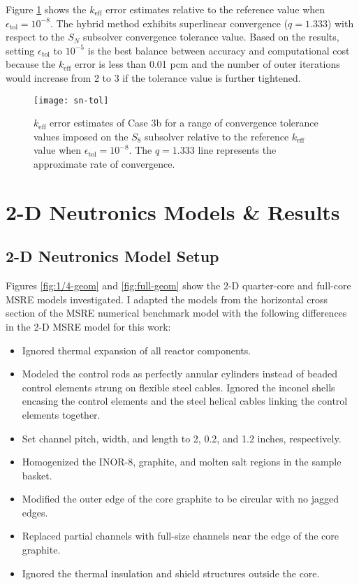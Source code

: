Figure \ref{fig:sn-tol} shows the $k_\text{eff}$ error estimates relative to the reference value
when $\epsilon_\text{tol}=10^{-8}$. The hybrid method exhibits superlinear convergence ($q=1.333$)
with respect to the $S_N$ subsolver convergence tolerance value. Based on the results, setting
$\epsilon_\text{tol}$ to $10^{-5}$ is the best balance between accuracy and computational
cost because the $k_\text{eff}$ error is less than 0.01 pcm and the number of outer iterations
would increase from 2 to 3 if the tolerance value is further tightened.

\begin{figure}[htb!]
  \centering
  \texttt{[image: sn-tol]}
  \caption{$k_\text{eff}$ error estimates of Case 3b for a range of convergence tolerance values
  imposed on the $S_8$ subsolver relative to the reference $k_\text{eff}$ value when
  $\epsilon_\text{tol}=10^{-8}$. The $q=1.333$ line represents the approximate rate of
  convergence.}
  \label{fig:sn-tol}
\end{figure}

\section{2-D Neutronics Models \& Results} \label{sec:2d-results}

\subsection{2-D Neutronics Model Setup} \label{sec:2d-model-setup}

Figures \ref{fig:1/4-geom} and \ref{fig:full-geom} show the 2-D quarter-core and full-core
\gls{MSRE} models investigated. I adapted the models from the horizontal cross section of the
\gls{MSRE} numerical benchmark model \cite{fratoni_molten_2020} with the
following differences in the 2-D \gls{MSRE} model for this work:

\begin{itemize}
  \item Ignored thermal expansion of all reactor components.
  \item Modeled the control rods as perfectly annular cylinders instead of beaded control elements
    strung on flexible steel cables. Ignored the inconel shells encasing the control elements and
    the steel helical cables linking the control elements together.
  \item Set channel pitch, width, and length to 2, 0.2, and 1.2 inches, respectively.
  \item Homogenized the INOR-8, graphite, and molten salt regions in the sample basket.
  \item Modified the outer edge of the core graphite to be circular with no jagged edges.
  \item Replaced partial channels with full-size channels near the edge of the core graphite.
  \item Ignored the thermal insulation and shield structures outside the core.
\end{itemize}

